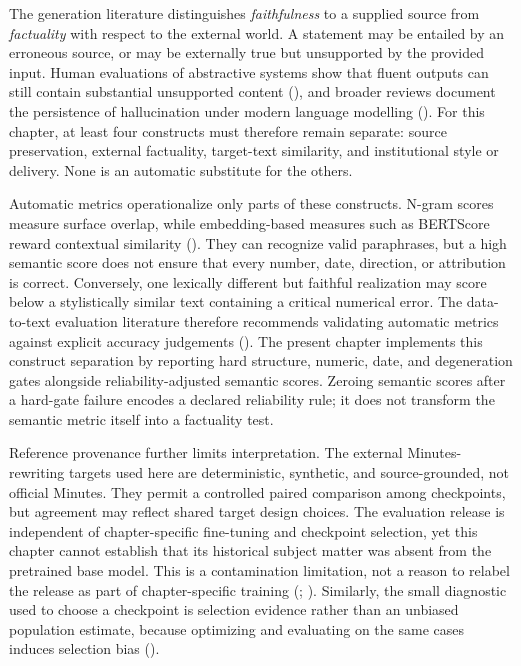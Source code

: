 The generation literature distinguishes \emph{faithfulness} to a supplied
source from \emph{factuality} with respect to the external world. A statement
may be entailed by an erroneous source, or may be externally true but
unsupported by the provided input. Human evaluations of abstractive systems
show that fluent outputs can still contain substantial unsupported content
(\cite{maynez2020faithfulness}), and broader reviews document the persistence
of hallucination under modern language modelling (\cite{huang2025survey}).
For this chapter, at least four constructs must therefore remain separate:
source preservation, external factuality, target-text similarity, and
institutional style or delivery. None is an automatic substitute for the
others.

Automatic metrics operationalize only parts of these constructs. N-gram
scores measure surface overlap, while embedding-based measures such as
BERTScore reward contextual similarity (\cite{zhang2019bertscore}). They can
recognize valid paraphrases, but a high semantic score does not ensure that
every number, date, direction, or attribution is correct. Conversely, one
lexically different but faithful realization may score below a stylistically
similar text containing a critical numerical error. The data-to-text
evaluation literature therefore recommends validating automatic metrics
against explicit accuracy judgements (\cite{thomson2020gold}). The present
chapter implements this construct separation by reporting hard structure,
numeric, date, and degeneration gates alongside reliability-adjusted semantic
scores. Zeroing semantic scores after a hard-gate failure encodes a declared
reliability rule; it does not transform the semantic metric itself into a
factuality test.

Reference provenance further limits interpretation. The external
Minutes-rewriting targets used here are deterministic, synthetic, and
source-grounded, not official Minutes. They permit a controlled paired
comparison among checkpoints, but agreement may reflect shared target design
choices. The evaluation release is independent of chapter-specific
fine-tuning and checkpoint selection, yet this chapter cannot establish that
its historical subject matter was absent from the pretrained base model. This
is a contamination limitation, not a reason to relabel the release as part of
chapter-specific training (\cite{magar2022contamination};
\cite{jacovi2023stop}). Similarly, the small diagnostic used to choose a
checkpoint is selection evidence rather than an unbiased population estimate,
because optimizing and evaluating on the same cases induces selection bias
(\cite{cawley2010overfitting}).

